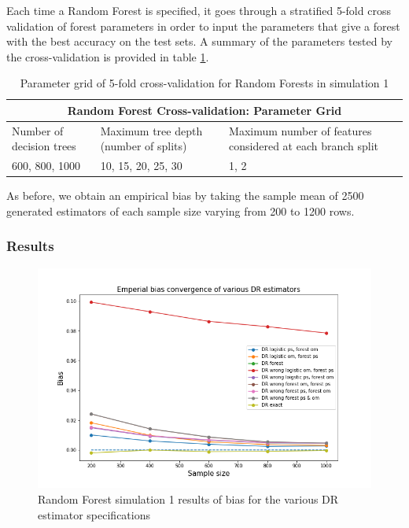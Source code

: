 \documentclass[12pt,twoside]{article}
\begin{document}
Each time a Random Forest is specified, it goes through a stratified 5-fold cross validation of forest parameters in order to input the parameters that give a forest with the best accuracy on the test sets. A summary of the parameters tested by the cross-validation is provided in table \ref{tableRF}.\\
\begin{table}[]
    \centering
\begin{tabular}{ |p{3cm}|p{3cm}|p{3cm}| }
 \hline
 \multicolumn{3}{|c|}{Random Forest Cross-validation: Parameter Grid} \\
 \hline
 Number of decision trees & Maximum tree depth (number of splits)  & Maximum    number of features considered at each branch split\\
 \hline
 600, 800, 1000& 10, 15, 20, 25, 30 & 1, 2 \\
 \hline 
\end{tabular}
\caption{Parameter grid of 5-fold cross-validation for Random Forests in simulation 1}
\label{tableRF}
\end{table}

As before, we obtain an empirical bias by taking the sample mean of 2500 generated estimators of each sample size varying from 200 to 1200 rows. 

\subsubsection*{Results}

\begin{figure}[h!]
    \centering
    \includegraphics[width = 0.9\columnwidth]{figures/biasRF.png}
    \caption{Random Forest simulation 1 results of bias for the various DR estimator specifications}
    \label{figbiasRF}
\end{figure}
\end{document}
